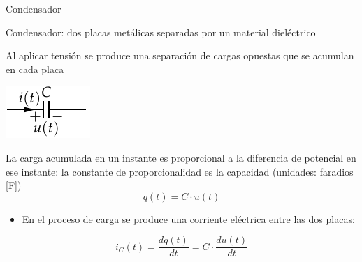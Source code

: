\documentclass[aspectratio=169, xcolor={usenames,svgnames,dvipsnames}]{beamer}
\begin{document}
\begin{frame}{Condensador}

    \vspace{2mm}
    \alert{Condensador}: dos placas metálicas separadas por un material dieléctrico 
    
    Al aplicar tensión se produce una \alert{separación de cargas opuestas} que se \alert{acumulan} en cada placa
    \vspace{-2mm}
    \begin{center}
    \includegraphics[height=0.2\textheight]{../figs/Condensador.pdf}
    \end{center}

    La \alert{carga acumulada} en un instante es \alert{proporcional} a la \alert{diferencia de potencial} en ese instante: la constante de proporcionalidad es la \alert{capacidad} (unidades: faradios [F]) %
    \[
    q(t) = C \cdot u(t)
    \]
    
    \begin{itemize}
    \item En el proceso de carga se produce una corriente eléctrica entre las dos placas:
    \end{itemize}
    \begin{equation*}
        i_C(t) = \frac{dq(t)}{dt} = \boxed{ C \cdot \frac{du(t)}{dt} } %
    \end{equation*}
\end{frame}

\end{document}
